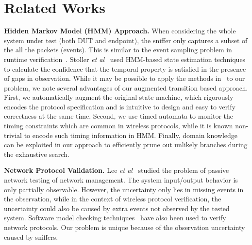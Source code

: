 \section{Related Works}
\label{sec:related}

\textbf{Hidden Markov Model (HMM) Approach.} When considering the whole system
under test (both DUT and endpoint), the sniffer only captures a subset of the
all the packets (events).  This is similar to the event sampling problem in
runtime
verification~\cite{bonakdarpour2011sampling,hauswirth2004low,arnold2008qvm,fei2006artemis}.
Stoller \textit{et al}~\cite{stoller2011runtime} used HMM-based state estimation
techniques to calculate the confidence that the temporal property is satisfied
in the presence of gaps in observation. While it may be possible to apply the
methods in~\cite{stoller2011runtime} to our problem, we note several advantages
of our augmented transition based approach.  First, we automatically augment the
original state machine, which rigorously encodes the protocol specification and
is intuitive to design and easy to verify correctness at the same time. Second,
we use timed automata to monitor the timing constraints which are common in
wireless protocols, while it is known non-trivial to encode such timing
information in HMM. Finally, domain knowledge can be exploited in our approach
to efficiently prune out unlikely branches during the exhaustive search.

\textbf{Network Protocol Validation.} Lee \textit{et al}~\cite{lee1997passive}
studied the problem of passive network testing of network management. The system
input/output behavior is only partially observable. However, the uncertainty
only lies in missing events in the observation, while in the context of wireless
protocol verification, the uncertainty could also be caused by extra events not
observed by the tested system. Software model checking
techniques~\cite{musuvathi2002cmc,godefroid1997model} have also been used to
verify network protocols. Our problem is unique because of the observation
uncertainty caused by sniffers.

